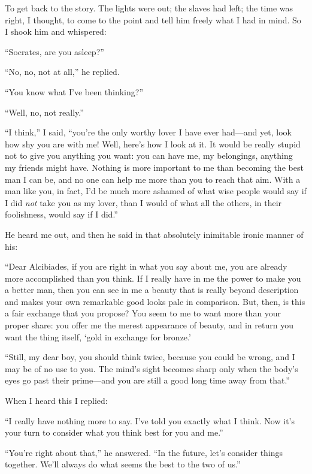  To get back to the story. The lights were out; the slaves had
left; the time was right, I thought, to come to the point and tell him
freely what I had in mind. So I shook him and whispered:

“Socrates, are you asleep?”

“No, no, not at all,” he replied.

“You know what I’ve been thinking?”

“Well, no, not really.”

“I think,” I said, “you’re the only worthy lover I have ever had---and
yet, look how shy you are with me! Well, here’s how I look at it. It
would  be really stupid not to give you anything you want: you
can have me, my belongings, anything my friends might have. Nothing is
more important to me than becoming the best man I can be, and no one can
help me more than you to reach that aim. With a man like you, in fact,
I’d be much more ashamed of what wise people would say if I did
{\em not} take you as my lover, than I would of what all the others, in
their foolishness, would say if I did.”

He heard me out, and then he said in that absolutely inimitable ironic
manner of his:

 “Dear Alcibiades, if you are right in what you say about me, you
are already more accomplished than you think. If I really have in me the
power to make you a better man, then you can see in me a beauty that is
really beyond description and makes your own remarkable good looks pale
in comparison. But, then, is this a fair exchange that you propose? You
seem to me to want more than your proper share: you offer me the merest
appearance of beauty, and in return you want the thing itself, ‘gold
 in exchange for
bronze.’

“Still, my dear boy, you should think twice, because you could be wrong,
and I may be of no use to you. The mind’s sight becomes sharp only when
the body’s eyes go past their prime---and you are still a good long time
away from that.”

When I heard this I replied:

“I really have nothing more to say. I’ve told you exactly what I think.
Now it’s your turn to consider what you think best for you and me.”

 “You’re right about that,” he answered. “In the future, let’s
consider things together. We’ll always do what seems the best to the two
of us.”

